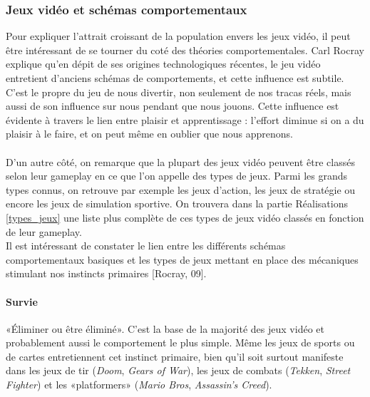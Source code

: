 	\subsubsection{Jeux vidéo et schémas comportementaux}
Pour expliquer l'attrait croissant de la population envers les jeux vidéo, il peut être intéressant de se tourner du coté des théories comportementales. Carl Rocray \cite{Rocr09} explique qu'en dépit de ses origines technologiques récentes, le jeu vidéo entretient d’anciens schémas de comportements, et cette influence est subtile. C’est le propre du jeu de nous divertir, non seulement de nos tracas réels, mais aussi de son influence sur nous pendant que nous jouons. Cette influence est évidente à travers le lien entre plaisir et apprentissage : l’effort diminue si on a du plaisir à le faire, et on peut même en oublier que nous apprenons.

\paragraph{}D'un autre côté, on remarque que la plupart des jeux vidéo peuvent être classés selon leur gameplay en ce que l'on appelle des types de jeux. Parmi les grands types connus, on retrouve par exemple les jeux d'action, les jeux de stratégie ou encore les jeux de simulation sportive. On trouvera dans la partie Réalisations \ref{types_jeux} une liste plus complète de ces types de jeux vidéo classés en fonction de leur gameplay. \\

Il est intéressant de constater le lien entre les différents schémas comportementaux basiques et les types de jeux mettant en place des mécaniques stimulant nos instincts primaires [Rocray, 09]\cite{Rocr09}.

\paragraph{}
		\paragraph{Survie \\ \quad}
«Éliminer ou être éliminé». C’est la base de la majorité des jeux vidéo et probablement aussi le comportement le plus simple. Même les jeux de sports ou de cartes entretiennent cet instinct primaire, bien qu’il soit surtout manifeste dans les jeux de tir (\emph{Doom}, \emph{Gears of War}), les jeux de combats (\emph{Tekken}, \emph{Street Fighter}) et les «platformers» (\emph{Mario Bros}, \emph{Assassin’s Creed}).

